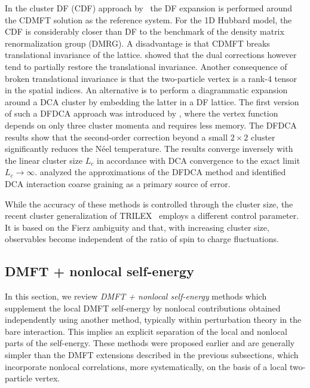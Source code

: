 \documentclass[rmp,aps,reprint,amsmath,amssymb,superscriptaddress,showpacs,nofootinbib]{revtex4-1}
\begin{document}
In the cluster DF (CDF) approach by~ the DF expansion is performed around the CDMFT solution as the reference system. For the 1D Hubbard model, the CDF is  considerably closer than DF to the benchmark of the density matrix renormalization group (DMRG)\cite{Hafermann2008}. A disadvantage is that CDMFT breaks translational invariance of the lattice.  showed that the dual corrections however tend to partially restore the translational invariance. Another consequence of broken translational invariance is that the two-particle vertex is a rank-4 tensor in the spatial indices. An alternative is to perform a diagrammatic expansion around a DCA cluster by embedding the latter in a DF lattice. The first version of such a DFDCA approach was introduced by  , where the vertex function depends on only three cluster momenta and requires less memory. The DFDCA results show that the second-order correction beyond a small $2\times 2$  cluster significantly reduces the N\'eel temperature. The results converge inversely with the linear cluster size $L_c$ in accordance with DCA convergence to the exact limit $L_c \to \infty$.  analyzed the approximations of the DFDCA method and identified DCA interaction coarse graining as a primary source of error.

While the accuracy of these methods is controlled through the cluster size, the recent cluster generalization of TRILEX~\cite{Ayral2017} employs a different control parameter. It is based on the Fierz ambiguity and that, with increasing cluster size, observables become independent of the ratio of spin to charge fluctuations.

\subsection{DMFT + nonlocal self-energy}
\label{subsec:DMFTplus}

In this section, we review  \emph{DMFT + nonlocal self-energy}  methods which supplement the local DMFT self-energy by nonlocal contributions obtained independently using another method, typically  within perturbation theory in the bare interaction. This implies an explicit separation of the local and nonlocal parts of the self-energy. These methods were proposed earlier and are generally simpler than the DMFT extensions described in the previous subsections, which incorporate nonlocal correlations, more systematically, on the basis of a local two-particle vertex.
\end{document}
